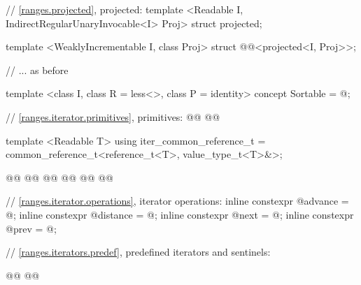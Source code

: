 \begin{codeblock}
{{    // \ref{ranges.projected}, projected:
    template <Readable I, IndirectRegularUnaryInvocable<I> Proj>
    struct projected;

    template <WeaklyIncrementable I, class Proj>
    struct @@<projected<I, Proj>>;

    // ... as before

    template <class I, class R = less<>, class P = identity>
    concept Sortable = @\seebelow@;

    // \ref{ranges.iterator.primitives}, primitives:
    @@
    @@

    template <Readable T> using iter_common_reference_t
      = common_reference_t<reference_t<T>, value_type_t<T>&>;

    @@
    @@
    @@
    @@
    @@
    @@

    // \ref{ranges.iterator.operations}, iterator operations:
    inline constexpr @\unspec@ advance = @\unspec@;
    inline constexpr @\unspec@ distance = @\unspec@;
    inline constexpr @\unspec@ next = @\unspec@;
    inline constexpr @\unspec@ prev = @\unspec@;

    // \ref{ranges.iterators.predef}, predefined iterators and sentinels:

    @@
    @@

}}
\end{codeblock}
